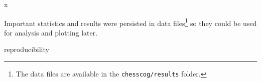 \documentclass[../main.tex]{subfiles}
\begin{document}
x

Important statistics and results were persisted in data files\footnote{The data files are available in the \texttt{chesscog/results} folder.} so they could be used for analysis and plotting later.

reproducibility


\end{document}
